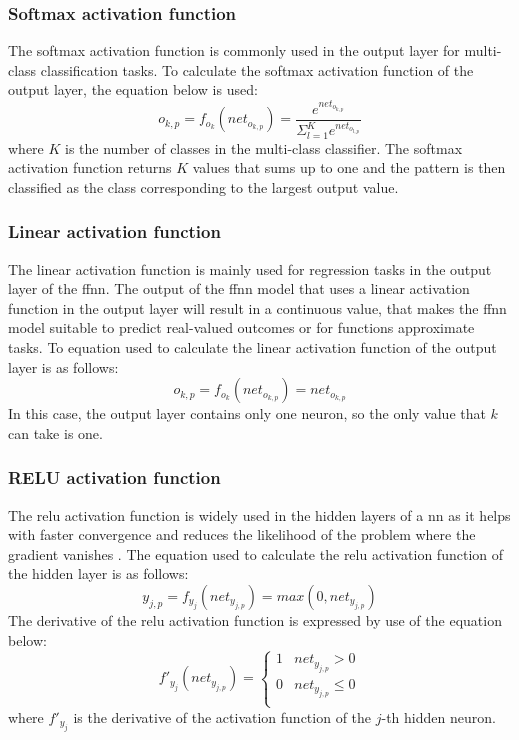 \documentclass[10pt, conference]{IEEEtran}
\begin{document}
\subsubsection{Softmax activation function}
The softmax activation function is commonly used in the output layer for multi-class classification tasks.
To calculate the softmax activation function of the output layer, the equation below is used:
\begin{equation}
    o_{k,p} = f_{o_k}(net_{o_{k,p}}) = \frac{e^{net_{o_{k,p}}}}{\Sigma_{l=1}^K e^{net_{o_{l,p}}}} \label{eq: softmax_activation}
\end{equation}
where $K$ is the number of classes in the multi-class classifier. The softmax activation function returns $K$ values
that sums up to one and the pattern is then classified as the class corresponding to the largest output value.

\subsubsection{Linear activation function}
The linear activation function is mainly used for regression tasks in the output layer of the \acrshort{ffnn}.
The output of the \acrshort{ffnn} model that uses a linear activation function in the output layer will result in
a continuous value, that makes the \acrshort{ffnn} model suitable to predict real-valued outcomes or for functions
approximate tasks. To equation used to calculate the linear activation function of the output layer is as follows:
\begin{equation}
    o_{k,p} = f_{o_k}(net_{o_{k,p}}) = net_{o_{k,p}} \label{eq: linear_activation}
\end{equation}
In this case, the output layer contains only one neuron, so the only value that $k$ can take is one.

\subsubsection{RELU activation function}
The \acrshort{relu} activation function is widely used in the hidden layers of a \acrshort{nn} as it
helps with faster convergence and reduces the likelihood of the problem where the gradient vanishes \cite{relu_ref}.
The equation used to calculate the \acrshort{relu} activation function of the hidden layer is as follows:
\begin{equation}
    y_{j,p} = f_{y_j}(net_{y_{j,p}}) = max(0,net_{y_{j,p}}) \label{eq: relu_activation}
\end{equation}
The derivative of the \acrshort{relu} activation function is expressed by use of the equation below:
\begin{equation}
    f'_{y_j}(net_{y_{j,p}}) = \left\{\begin{array}{ll}1 & net_{y_{j,p}} > 0 \\ 0 & net_{y_{j,p}} \leq 0 \\\end{array}\right. \label{eq: relu_activation_derivative}
\end{equation}
where $f'_{y_j}$ is the derivative of the activation function of the $j$-th hidden neuron.
\end{document}
